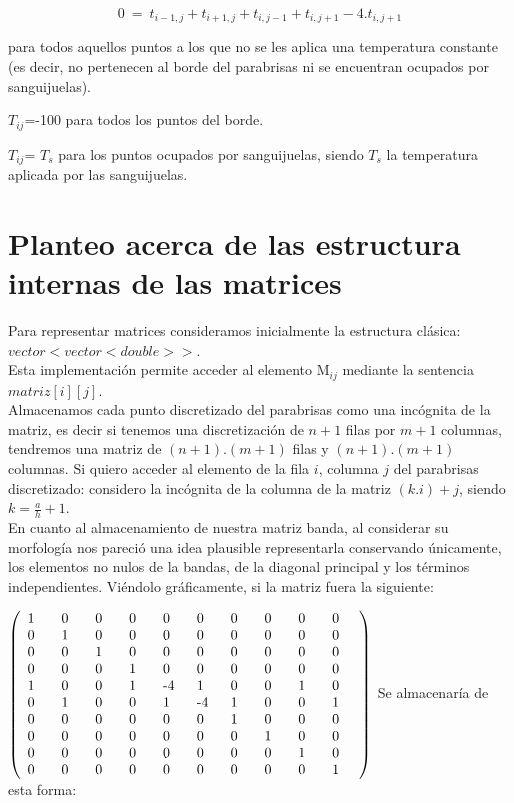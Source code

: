 \documentclass[double, 1.5in, 12pt]{beavtex}
\begin{document}
\begin{equation}
0 \ =\  t_{i-1,j} + t_{i+1,j} + t_{i,j-1} + t_{i,j+1} - 4.t_{i,j+1}\label{eq:calordd}
\end{equation}

para todos aquellos puntos a los que no se les aplica una temperatura constante  (es decir, no pertenecen al borde del parabrisas ni se encuentran ocupados por sanguijuelas).

	$T_{ij}$=-100 para todos los puntos del borde.

	$T_{ij}$= $T_s$ para los puntos ocupados por sanguijuelas, siendo $T_s$ la temperatura aplicada por las sanguijuelas.


\section{Planteo acerca de las estructura internas de las matrices}

Para representar matrices consideramos inicialmente la estructura cl\'asica: $vector<vector<double>>$. \\
Esta implementaci\'on permite acceder al elemento M$_{ij}$ mediante la sentencia $matriz[i][j]$. \\
Almacenamos cada punto discretizado del parabrisas como una inc\'ognita de la matriz, es decir si tenemos una discretizaci\'on de $n+1$ filas por $m+1$ columnas, tendremos una matriz de $(n+1).(m+1)$ filas y $(n+1).(m+1)$ columnas. Si quiero acceder al elemento de la fila $i$, columna $j$ del parabrisas discretizado: considero la inc\'ognita de la columna de la matriz $(k.i)+ j$, siendo $k=\frac{a}{h}+1$. \\
En cuanto al almacenamiento de nuestra matriz banda, al considerar su morfolog\'ia nos pareci\'o una idea plausible representarla conservando  \'unicamente, los elementos no nulos de la bandas, de la diagonal principal y los t\'erminos independientes. Vi\'endolo gr\'aficamente, si la matriz fuera la siguiente:


$
\left(
       \begin{array}{p{5mm}p{5mm}p{5mm}p{5mm}p{5mm}p{5mm}p{5mm}p{5mm}p{5mm}p{5mm}}
1 & 0 & 0 & 0 & 0 & 0 & 0 & 0 & 0 & 0 \\
0 & 1 & 0 & 0 & 0 & 0 & 0 & 0 & 0 & 0 \\
0 & 0 & 1 & 0 & 0 & 0 & 0 & 0 & 0 & 0 \\
0 & 0 & 0 & 1 & 0 & 0 & 0 & 0 & 0 & 0\\
1 & 0 & 0 & 1 & -4 & 1 & 0 & 0 & 1 & 0 \\
0 & 1 & 0 & 0 & 1 & -4 & 1 & 0 & 0 & 1 \\
0 & 0 & 0 & 0 & 0 & 0 & 1 & 0 & 0 & 0\\
0 & 0 & 0 & 0 & 0 & 0 & 0 & 1 & 0 & 0\\
0 & 0 & 0 & 0 & 0 & 0 & 0 & 0 & 1 & 0\\
0 & 0 & 0 & 0 & 0 & 0 & 0 & 0 & 0 & 1\\

       \end{array}
\right)
$
\emptyline
\emptyline
\emptyline
Se almacenar\'ia de esta forma:\\
\end{document}
